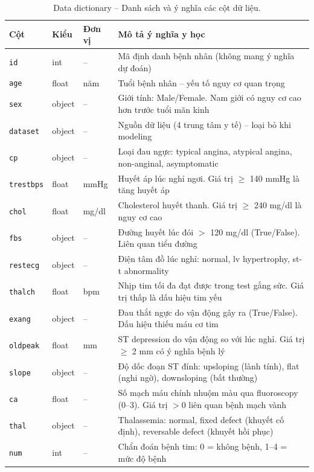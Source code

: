 \begin{table}[H]
\centering
\caption{Data dictionary -- Danh sách và ý nghĩa các cột dữ liệu.}
\label{tab:data_dict}
\footnotesize
\begin{tabular}{|l|l|l|p{8cm}|}
\hline
\textbf{Cột} & \textbf{Kiểu} & \textbf{Đơn vị} & \textbf{Mô tả ý nghĩa y học} \\ \hline
\texttt{id} & int & -- & Mã định danh bệnh nhân (không mang ý nghĩa dự đoán) \\ \hline
\texttt{age} & float & năm & Tuổi bệnh nhân -- yếu tố nguy cơ quan trọng \\ \hline
\texttt{sex} & object & -- & Giới tính: Male/Female. Nam giới có nguy cơ cao hơn trước tuổi mãn kinh \\ \hline
\texttt{dataset} & object & -- & Nguồn dữ liệu (4 trung tâm y tế) -- loại bỏ khi modeling \\ \hline
\texttt{cp} & object & -- & Loại đau ngực: typical angina, atypical angina, non-anginal, asymptomatic \\ \hline
\texttt{trestbps} & float & mmHg & Huyết áp lúc nghỉ ngơi. Giá trị $\geq$ 140 mmHg là tăng huyết áp \\ \hline
\texttt{chol} & float & mg/dl & Cholesterol huyết thanh. Giá trị $\geq$ 240 mg/dl là nguy cơ cao \\ \hline
\texttt{fbs} & object & -- & Đường huyết lúc đói $>$ 120 mg/dl (True/False). Liên quan tiểu đường \\ \hline
\texttt{restecg} & object & -- & Điện tâm đồ lúc nghỉ: normal, lv hypertrophy, st-t abnormality \\ \hline
\texttt{thalch} & float & bpm & Nhịp tim tối đa đạt được trong test gắng sức. Giá trị thấp là dấu hiệu tim yếu \\ \hline
\texttt{exang} & object & -- & Đau thắt ngực do vận động gây ra (True/False). Dấu hiệu thiếu máu cơ tim \\ \hline
\texttt{oldpeak} & float & mm & ST depression do vận động so với lúc nghỉ. Giá trị $\geq$ 2 mm có ý nghĩa bệnh lý \\ \hline
\texttt{slope} & object & -- & Độ dốc đoạn ST đỉnh: upsloping (lành tính), flat (nghi ngờ), downsloping (bất thường) \\ \hline
\texttt{ca} & float & -- & Số mạch máu chính nhuộm màu qua fluoroscopy (0--3). Giá trị $> 0$ liên quan bệnh mạch vành \\ \hline
\texttt{thal} & object & -- & Thalassemia: normal, fixed defect (khuyết cố định), reversable defect (khuyết hồi phục) \\ \hline
\texttt{num} & int & -- & Chẩn đoán bệnh tim: 0 = không bệnh, 1--4 = mức độ bệnh \\ \hline
\end{tabular}
\end{table}

